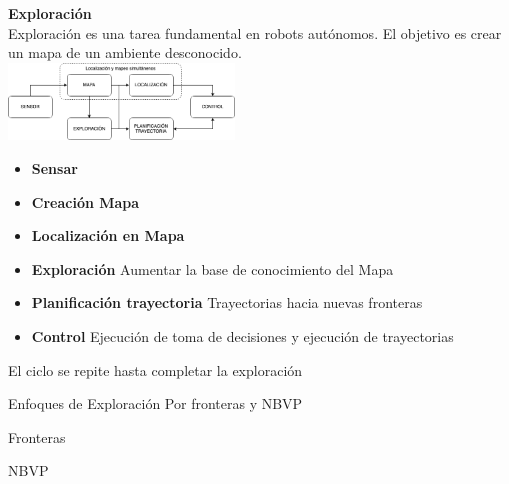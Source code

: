 \documentclass[
  24pt, %
  aspectratio=169, %
]{beamer}
\begin{document}
\begin{frame}
  \textbf{Exploración}\\
  \bigskip %
  Exploración es una tarea fundamental en robots autónomos. El objetivo es crear un mapa de un ambiente desconocido.\\
  \bigskip %
  \centering
  \includegraphics[width=6cm]{exploracion}\\
  
  \begin{itemize}
  \item \textbf{Sensar} 
  \item \textbf{Creación Mapa} 
  \item \textbf{Localización en Mapa}
  \item \textbf{Exploración} Aumentar la base de conocimiento del Mapa
  \item \textbf{Planificación trayectoria} Trayectorias hacia nuevas fronteras 
  \item \textbf{Control} Ejecución de toma de decisiones y ejecución de trayectorias 
  \end{itemize}

  \pause \alert{El ciclo se repite hasta completar la exploración}
  
\end{frame}

\begin{frame}
  Enfoques de Exploración Por fronteras y NBVP
\end{frame}

\begin{frame}
  Fronteras
\end{frame}

\begin{frame}
  NBVP
\end{frame}
  
\end{document}
